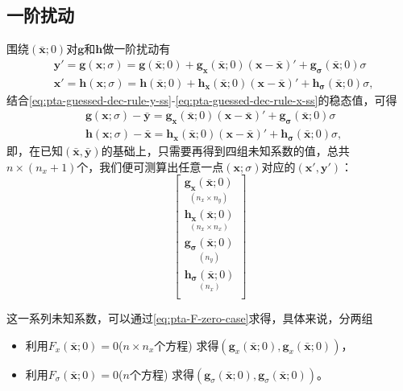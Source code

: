 \subsection{一阶扰动}
\label{pta-perturbation-first-order}
围绕$(\bar{\bm{x}};0)$对$\bm{g}$和$\bm{h}$做一阶扰动有
\begin{equation*}
  \begin{split}
    &\bm{y}' = \bm{g}(\bm{x};\sigma) = \bm{g}(\bar{\bm{x}}; 0) + \bm{g_x}(\bar{\bm{x}}; 0) (\bm{x} - \bar{\bm{x}})' + \bm{g_\sigma} (\bar{\bm{x}}; 0) \sigma\\
    &\bm{x}' = \bm{h}(\bm{x};\sigma)= \bm{h}(\bar{\bm{x}}; 0) + \bm{h_x}(\bar{\bm{x}}; 0) (\bm{x} - \bar{\bm{x}})' + \bm{h_\sigma} (\bar{\bm{x}}; 0) \sigma,
  \end{split}
\end{equation*}
结合\eqref{eq:pta-guessed-dec-rule-y-ss}-\eqref{eq:pta-guessed-dec-rule-x-ss}的稳态值，可得
\begin{equation}
  \label{eq:pta-gh-ss-int}
  \begin{split}
    &\bm{g}(\bm{x};\sigma) - \bar{\bm{y}}= \bm{g_x}(\bar{\bm{x}}; 0) (\bm{x} - \bar{\bm{x}})' + \bm{g_\sigma} (\bar{\bm{x}}; 0) \sigma\\
    &\bm{h}(\bm{x};\sigma) - \bar{\bm{x}}=  \bm{h_x}(\bar{\bm{x}}; 0) (\bm{x} - \bar{\bm{x}})' + \bm{h_\sigma} (\bar{\bm{x}}; 0) \sigma,
  \end{split}
\end{equation}
即，在已知$(\bar{\bm{x}},\bar{\bm{y}})$的基础上，只需要再得到四组未知系数的值，总共$n \times (n_x + 1)$个，我们便可测算出任意一点$(\bm{x};\sigma)$对应的$(\bm{x}',\bm{y}')$：
\begin{equation*}
  \begin{bmatrix}
    \underset{(n_x \times n_y)}{\bm{g_x}(\bar{\bm{x}};0)} \\
    \underset{(n_x \times n_x)}{\bm{h_x}(\bar{\bm{x}};0)} \\
    \underset{(n_y)}{\bm{g_\sigma}(\bar{\bm{x}};0)} \\
    \underset{(n_x)}{\bm{h_\sigma}(\bar{\bm{x}};0)} \\
  \end{bmatrix}
\end{equation*}

这一系列未知系数，可以通过\eqref{eq:pta-F-zero-case}求得，具体来说，分两组
\begin{itemize}
  \item 利用$F_{x}(\bar{\bm{x}};0) = 0$($n \times n_x$个方程) 求得$\left( \bm{g}_{x}(\bar{\bm{x}};0), \bm{g}_{x}(\bar{\bm{x}};0)\right)$，
  \item 利用$F_{\sigma}(\bar{\bm{x}};0) = 0$($n$个方程) 求得$\left( \bm{g}_{\sigma}(\bar{\bm{x}};0), \bm{g}_{\sigma}(\bar{\bm{x}};0)\right)$。
\end{itemize}

